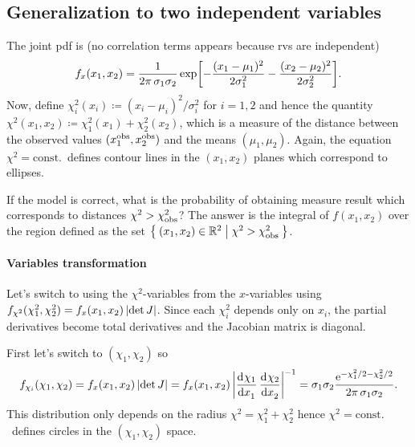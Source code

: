 \subsection{Generalization to two independent variables}

The joint \ac{pdf} is (no correlation terms appears because \acp{rv} are independent)
\begin{equation}
	f_x(x_1,x_2) = \frac{1}{2\pi\,\sigma_1\sigma_2}\exp\qp*{
		-\frac{(x_1-\mu_1)^2}{2\sigma_1^2}
		-\frac{(x_2-\mu_2)^2}{2\sigma_2^2}
	}.
\end{equation}
Now, define $\chi^2_i(x_i)\coloneqq (x_i-\mu_i)^2\!/\sigma_i^2$ for $i=1,2$ and hence the quantity $\chi^2(x_1,x_2) \coloneqq \chi^2_1(x_1) + \chi^2_2(x_2)$, which is a measure of the distance between the observed values $(x_1^\textup{obs},x_2^\textup{obs})$ and the means $(\mu_1,\mu_2)$.
Again, the equation $\chi^2 = \text{const.}$~defines contour lines in the $(x_1,x_2)$ planes which correspond to ellipses.


If the model is correct, what is the probability of obtaining measure result which corresponds to distances $\chi^2 > \chi^2_\textup{obs}$?
The answer is the integral of $f(x_1,x_2)$ over the region defined as the set $\Set{(x_1,x_2)\in\ensuremath{\mathbb{R}}^2|\chi^2 > \chi^2_\textup{obs}}$.


\paragraph{Variables transformation}
Let's switch to using the $\chi^2$-variables from the $x$-variables using $f_{\chi^2}(\chi^2_1,\chi^2_2) = f_x(x_1,x_2)\,\lvert\det J\rvert$.
Since each $\chi^2_i$ depends only on $x_i$, the partial derivatives become total derivatives and the Jacobian matrix is diagonal.


First let's switch to $(\chi_1,\chi_2)$ so
\begin{equation}\label{eq:chiIplane}
	f_{\chi_i}(\chi_1,\chi_2) = f_x(x_1,x_2)\,\abs{\det J} = f_x(x_1,x_2)\,\abs*{\deriv{\chi_1}{x_1}\,\deriv{\chi_2}{x_2}}^{-1} = \sigma_1\sigma_2 \frac{\eu^{-\chi^2_1/2 - \chi^2_2/2 }}{2\pi\,\sigma_1\sigma_2}.
\end{equation}
This distribution only depends on the radius $\chi^2  = \chi_1^2 + \chi_2^2$ hence $\chi^2 = \text{const.}$~defines circles in the $(\chi_1,\chi_2)$ space.


